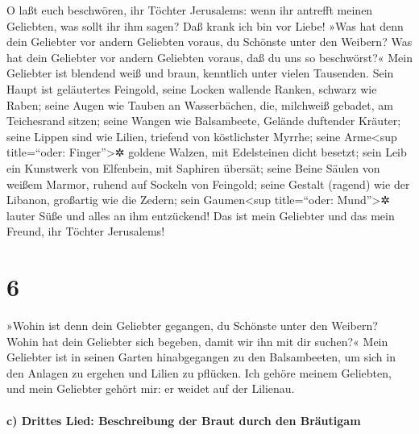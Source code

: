 O laßt euch beschwören, ihr Töchter Jerusalems: wenn ihr
antrefft meinen Geliebten, was sollt ihr ihm sagen? Daß krank ich bin
vor Liebe! »Was hat denn dein Geliebter vor andern
Geliebten voraus, du Schönste unter den Weibern? Was hat dein Geliebter
vor andern Geliebten voraus, daß du uns so beschwörst?«
Mein Geliebter ist blendend weiß und braun, kenntlich
unter vielen Tausenden. Sein Haupt ist geläutertes
Feingold, seine Locken wallende Ranken, schwarz wie Raben;
seine Augen wie Tauben an Wasserbächen, die, milchweiß
gebadet, am Teichesrand sitzen; seine Wangen wie
Balsambeete, Gelände duftender Kräuter; seine Lippen sind wie Lilien,
triefend von köstlichster Myrrhe; seine Arme\textless sup
title=``oder: Finger''\textgreater✲ goldene Walzen, mit Edelsteinen
dicht besetzt; sein Leib ein Kunstwerk von Elfenbein, mit Saphiren
übersät; seine Beine Säulen von weißem Marmor, ruhend auf
Sockeln von Feingold; seine Gestalt (ragend) wie der Libanon, großartig
wie die Zedern; sein Gaumen\textless sup title=``oder:
Mund''\textgreater✲ lauter Süße und alles an ihm entzückend! Das ist
mein Geliebter und das mein Freund, ihr Töchter Jerusalems!

\hypertarget{section-5}{%
\section{6}\label{section-5}}

»Wohin ist denn dein Geliebter gegangen, du Schönste unter
den Weibern? Wohin hat dein Geliebter sich begeben, damit wir ihn mit
dir suchen?« Mein Geliebter ist in seinen Garten
hinabgegangen zu den Balsambeeten, um sich in den Anlagen zu ergehen und
Lilien zu pflücken. Ich gehöre meinem Geliebten, und mein
Geliebter gehört mir: er weidet auf der Lilienau.

\hypertarget{c-drittes-lied-beschreibung-der-braut-durch-den-bruxe4utigam-1}{%
\paragraph{c) Drittes Lied: Beschreibung der Braut durch den
Bräutigam}\label{c-drittes-lied-beschreibung-der-braut-durch-den-bruxe4utigam-1}}

